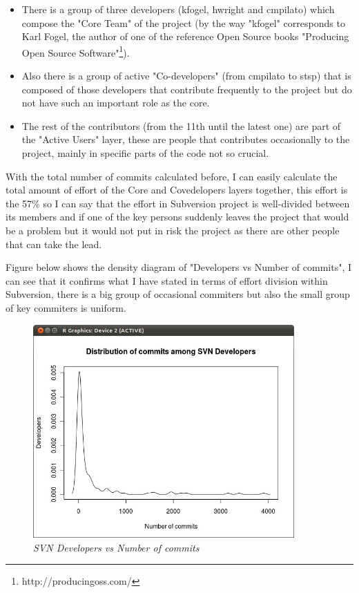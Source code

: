 \documentclass[a4paper,10pt]{article}
\begin{document}
\begin{itemize}
\item  There is a group of three developers (kfogel, hwright and cmpilato) which
compose the "Core Team" of the project (by the way "kfogel" corresponds to Karl
Fogel, the author of one of the reference Open Source books "Producing Open
Source Software"\footnote{http://producingoss.com/}).
\item  Also there is a group of active "Co-developers" (from cmpilato to stsp)
that is composed of those developers that contribute frequently to the project
but do not have such an important role as the core.
\item The rest of the contributors (from the 11th until the latest one) are part
of the "Active Users" layer, these are people that contributes occasionally to
the project, mainly in specific parts of the code not so crucial.
\end{itemize}

With the total number of commits calculated before, I can easily calculate the
total amount of effort of the Core and Covedelopers layers together, this effort
is the 57\% so I can say that the effort in Subversion project is well-divided
between its members and if one of the key persons suddenly leaves the project
that would be a problem but it would not put in risk the project as there are
other people that can take the lead.

Figure below shows the density diagram of "Developers vs Number of commits", I
can see that it confirms what I have stated in terms of effort division within
Subversion, there is a big group of occasional commiters but also the small
group of key commiters is uniform.

\begin{figure}[H]
    \centering
    \includegraphics[width=10cm, keepaspectratio]{img/SVNdensity.jpg}
    \caption{\textit{SVN Developers vs Number of commits}}
    \label{figure:svndensity}
 \end{figure}
\end{document}
